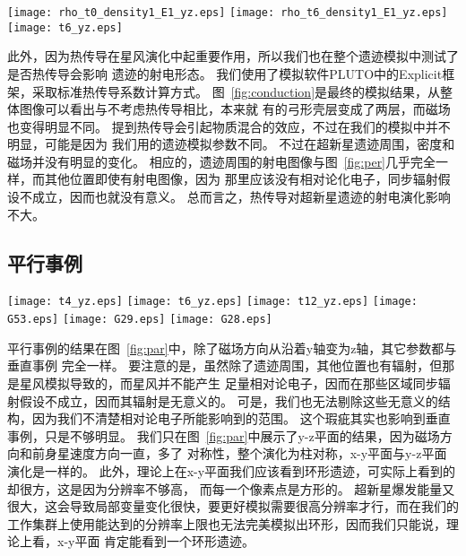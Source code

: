 \begin{figure*}
    \centering
    \texttt{[image: rho\_t0\_density1\_E1\_yz.eps]}
    \texttt{[image: rho\_t6\_density1\_E1\_yz.eps]}
    \texttt{[image: t6\_yz.eps]}
    \caption{平行事例的模拟结果。 左图是y-z平面的星风模拟结果加上遗迹爆发区域，也就是
    遗迹模拟的初始条件。中图是y-z平面的遗迹模拟结果。右图是从中图转化来的射电流量密度图。}
\label{fig:par}
\end{figure*}

此外，因为热传导在星风演化中起重要作用，所以我们也在整个遗迹模拟中测试了是否热传导会影响
遗迹的射电形态。
我们使用了模拟软件PLUTO中的Explicit框架，采取标准热传导系数计算方式。
图~\ref{fig:conduction}是最终的模拟结果，从整体图像可以看出与不考虑热传导相比，本来就
有的弓形壳层变成了两层，而磁场也变得明显不同。
\citet{Meyer2015}提到热传导会引起物质混合的效应，不过在我们的模拟中并不明显，可能是因为
我们用的遗迹模拟参数不同。
不过在超新星遗迹周围，密度和磁场并没有明显的变化。
相应的，遗迹周围的射电图像与图~\ref{fig:per}几乎完全一样，而其他位置即使有射电图像，因为
那里应该没有相对论化电子，同步辐射假设不成立，因而也就没有意义。
总而言之，热传导对超新星遗迹的射电演化影响不大。

\subsection{平行事例}



\begin{figure*}
    \centering
    \texttt{[image: t4\_yz.eps]}
    \texttt{[image: t6\_yz.eps]}
    \texttt{[image: t12\_yz.eps]}\newline
    \texttt{[image: G53.eps]}
    \texttt{[image: G29.eps]}
    \texttt{[image: G28.eps]}
    \caption{上面三幅图是不同年龄的相对射电流量密度图。下面三幅图是实际观测到的与上图
    类似的实际观测到的八字形遗迹：G53.6-2.2、G29.7-0.3、G28.6-0.1\citep{West2016}。}
\label{fig:parc}
\end{figure*}

平行事例的结果在图~\ref{fig:par}中，除了磁场方向从沿着y轴变为z轴，其它参数都与垂直事例
完全一样。
要注意的是，虽然除了遗迹周围，其他位置也有辐射，但那是星风模拟导致的，而星风并不能产生
足量相对论电子，因而在那些区域同步辐射假设不成立，因而其辐射是无意义的。
可是，我们也无法剔除这些无意义的结构，因为我们不清楚相对论电子所能影响到的范围。
这个瑕疵其实也影响到垂直事例，只是不够明显。
我们只在图~\ref{fig:par}中展示了y-z平面的结果，因为磁场方向和前身星速度方向一直，多了
对称性，整个演化为柱对称，x-y平面与y-z平面演化是一样的。
此外，理论上在x-y平面我们应该看到环形遗迹，可实际上看到的却很方，这是因为分辨率不够高，
而每一个像素点是方形的。
超新星爆发能量又很大，这会导致局部变量变化很快，要更好模拟需要很高分辨率才行，而在我们的
工作集群上使用能达到的分辨率上限也无法完美模拟出环形，因而我们只能说，理论上看，x-y平面
肯定能看到一个环形遗迹。

